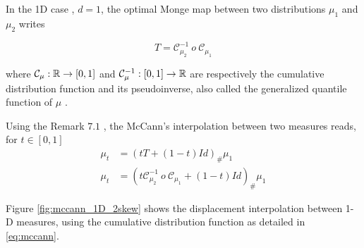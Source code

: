 In the 1D case \cite[see][Remark 2.30]{peyre_computational_2020}, $d=1$, the optimal Monge map between two distributions $\mu_1$ and $\mu_2$ writes 

\begin{equation}\label{eq:monge_map}
    T=\mathcal{C}^{-1}_{\mu_2}\ o\ \mathcal{C}_{\mu_1} 
\end{equation}

where $\mathcal{C}_{\mu} : \mathbb{R} \rightarrow [0, 1]$ and $\mathcal{C}^{-1}_\mu : [0, 1]\rightarrow \mathbb{R} $ are respectively the cumulative distribution function and its pseudoinverse, also called the generalized quantile function of $\mu$ .

Using the Remark $7.1$ \cite{peyre_computational_2020}, the McCann's interpolation \cite{mccann_convexity_1997} between two measures reads, for $t\in [0, 1]$ 
\begin{align}
    \mu_t &= (tT + (1-t)Id)_\#\mu_1 \nonumber \\
    \mu_t &= (t\mathcal{C}^{-1}_{\mu_2}\ o\ \mathcal{C}_{\mu_1} + (1-t)Id)_\#\mu_1 \label{eq:mccann}
\end{align}

Figure \ref{fig:mccann_1D_2skew} shows the displacement interpolation between 1-D measures, using the cumulative distribution function as detailed in \eqref{eq:mccann}.

